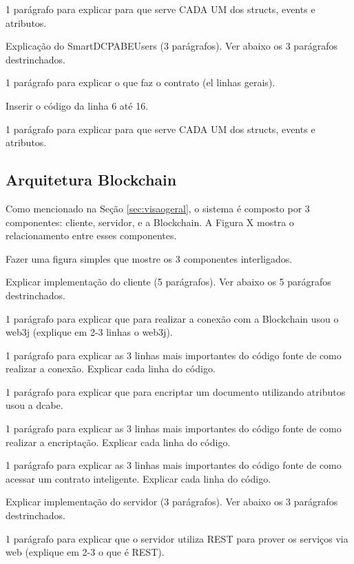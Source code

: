 \documentclass[a4paper,11pt]{article}
\begin{document}
{\color{Magenta} 1 parágrafo para explicar para que serve CADA UM dos structs, events e atributos.}

{\color{ForestGreen} Explicação do  SmartDCPABEUsers  (3 parágrafos). Ver abaixo os 3 parágrafos destrinchados.}

{\color{Magenta} 1 parágrafo para explicar o que faz o contrato (el linhas gerais).}

{\color{Magenta} Inserir o código da linha 6 até 16.}

{\color{Magenta} 1 parágrafo para explicar para que serve CADA UM dos structs, events e atributos.}

\subsection{Arquitetura Blockchain}

Como mencionado na Seção \ref{sec:visaogeral}, o sistema é composto por 3 componentes: cliente, servidor, e a Blockchain. A Figura X mostra o relacionamento entre esses componentes.

{\color{ForestGreen} Fazer uma figura simples que mostre os 3 componentes interligados. }


{\color{ForestGreen} Explicar implementação do cliente (5 parágrafos). Ver abaixo os 5 parágrafos destrinchados. }

{\color{Magenta} 1 parágrafo para explicar que para realizar a conexão com a Blockchain usou o web3j (explique em 2-3 linhas o web3j).}

{\color{Magenta} 1 parágrafo para explicar as 3 linhas mais importantes do código fonte de como realizar a conexão. Explicar cada linha do código. }

{\color{Magenta} 1 parágrafo para explicar que para encriptar um documento utilizando atributos usou a dcabe.}

{\color{Magenta} 1 parágrafo para explicar as 3 linhas mais importantes do código fonte de como realizar a encriptação. Explicar cada linha do código.}

{\color{Magenta} 1 parágrafo para explicar as 3 linhas mais importantes do código fonte de como acessar um contrato inteligente. Explicar cada linha do código.}

{\color{ForestGreen} Explicar implementação do servidor (3 parágrafos). Ver abaixo os 3 parágrafos destrinchados. }

{\color{Magenta} 1 parágrafo para explicar que o servidor utiliza REST para prover os serviços via web  (explique em 2-3 o que é REST).}
\end{document}

